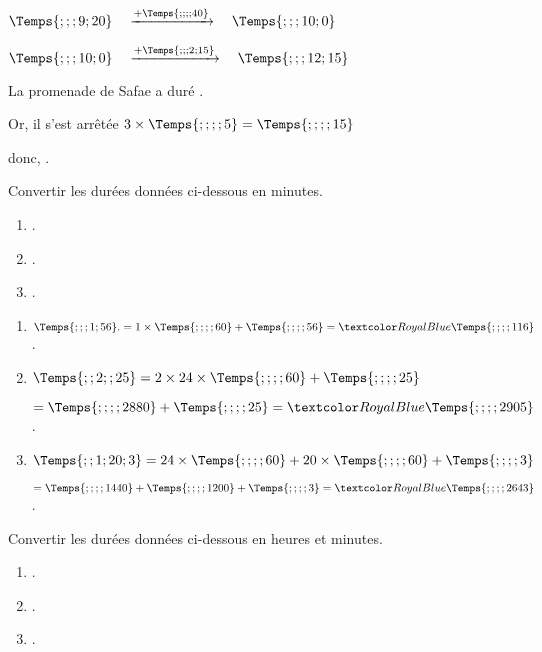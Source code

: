 \begin{Maquette}[Fiche,CorrigeFin,Colonnes=2]{}
\begin{multicols}{2}
      \begin{Solution}
         $\Temps{;;;9;20} \quad \xrightarrow{+\Temps{;;;;40}} \quad \Temps{;;;10;0}$ \par
         $\Temps{;;;10;0} \quad \xrightarrow{+\Temps{;;;2;15}} \quad \Temps{;;;12;15}$ \par
         La promenade de Safae a duré . \par
         Or, il s'est arrêtée $3\times\Temps{;;;;5} =\Temps{;;;;15}$ \par
         donc, .
      \end{Solution}
      
      
      \begin{exercice} %
         Convertir les durées données ci-dessous en minutes.
         \begin{enumerate}
            \item {}.
            \item {}.
            \item {}.
         \end{enumerate}
      \end{exercice}
      
      \begin{Solution}
         \begin{enumerate}
            \item $\Temps{;;;1;56}. =1\times\Temps{;;;;60}+\Temps{;;;;56} =\cor{\Temps{;;;;116}}$.
            \item $\Temps{;;2;;25} =2\times24\times\Temps{;;;;60}+\Temps{;;;;25}$ \par
               \quad $=\Temps{;;;;2880}+\Temps{;;;;25} =\cor{\Temps{;;;;2905}}$.
            \item $\Temps{;;1;20;3} =24\times\Temps{;;;;60}+20\times\Temps{;;;;60}+\Temps{;;;;3}$ \par
               \quad $=\Temps{;;;;1440}+\Temps{;;;;1200}+\Temps{;;;;3} =\cor{\Temps{;;;;2643}}$.
         \end{enumerate}
      \end{Solution}
      
      
      \begin{exercice} %
         Convertir les durées données ci-dessous en heures et minutes.
         \begin{enumerate}
            \item {}.
            \item {}.
            \item {}.
         \end{enumerate}
      \end{exercice}
      

\end{multicols}
\end{Maquette}

